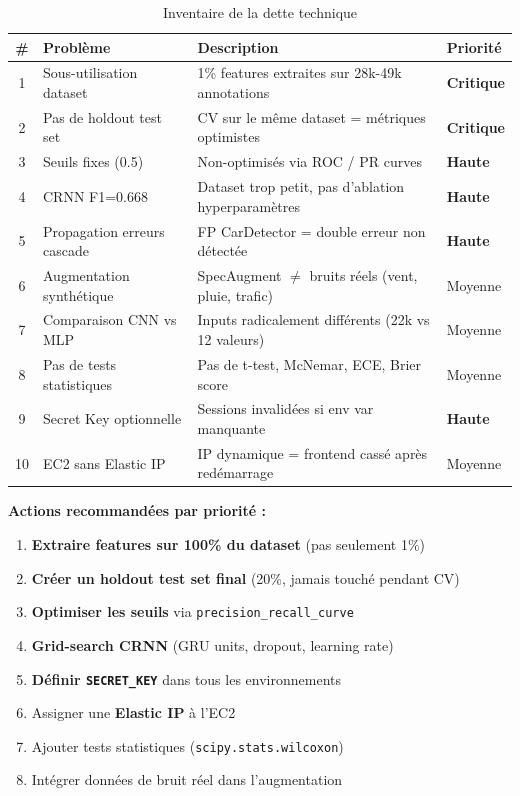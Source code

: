 \documentclass[11pt,a4paper]{article}
\newcommand{\code}[1]{\texttt{\small #1}}
\newcommand{\critical}[1]{\textcolor{dangertext}{\textbf{#1}}}
\newcommand{\warn}[1]{\textcolor{orange!70!black}{\textbf{#1}}}
\begin{document}
\begin{table}[htbp]
\centering
\begin{tabular}{@{}clp{8cm}l@{}}
\toprule
\textbf{\#} & \textbf{Problème} & \textbf{Description} & \textbf{Priorité} \\
\midrule
1 & Sous-utilisation dataset & 1\% features extraites sur 28k-49k annotations & \critical{Critique} \\
2 & Pas de holdout test set & CV sur le même dataset = métriques optimistes & \critical{Critique} \\
3 & Seuils fixes (0.5) & Non-optimisés via ROC / PR curves & \warn{Haute} \\
4 & CRNN F1=0.668 & Dataset trop petit, pas d'ablation hyperparamètres & \warn{Haute} \\
5 & Propagation erreurs cascade & FP CarDetector = double erreur non détectée & \warn{Haute} \\
6 & Augmentation synthétique & SpecAugment $\neq$ bruits réels (vent, pluie, trafic) & Moyenne \\
7 & Comparaison CNN vs MLP & Inputs radicalement différents (22k vs 12 valeurs) & Moyenne \\
8 & Pas de tests statistiques & Pas de t-test, McNemar, ECE, Brier score & Moyenne \\
9 & Secret Key optionnelle & Sessions invalidées si env var manquante & \warn{Haute} \\
10 & EC2 sans Elastic IP & IP dynamique = frontend cassé après redémarrage & Moyenne \\
\bottomrule
\end{tabular}
\caption{Inventaire de la dette technique}
\end{table}

\textbf{Actions recommandées par priorité :}
\begin{enumerate}
  \item \critical{Extraire features sur 100\% du dataset} (pas seulement 1\%)
  \item \critical{Créer un holdout test set final} (20\%, jamais touché pendant CV)
  \item \warn{Optimiser les seuils} via \code{precision\_recall\_curve}
  \item \warn{Grid-search CRNN} (GRU units, dropout, learning rate)
  \item \warn{Définir \code{SECRET\_KEY}} dans tous les environnements
  \item Assigner une \textbf{Elastic IP} à l'EC2
  \item Ajouter tests statistiques (\code{scipy.stats.wilcoxon})
  \item Intégrer données de bruit réel dans l'augmentation
\end{enumerate}
\end{document}
